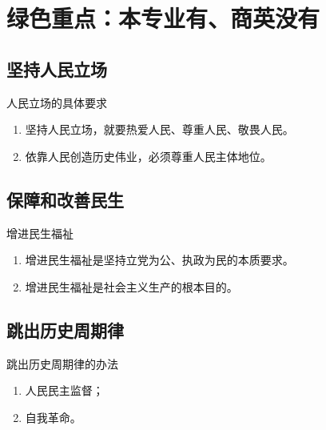 \documentclass[12pt,a4paper]{ctexart}
\begin{document}
\section{绿色重点：本专业有、商英没有}

\subsection{坚持人民立场}

\begin{greenbox}{人民立场的具体要求}
\begin{enumerate}
  \item 坚持人民立场，就要热爱人民、尊重人民、敬畏人民。
  \item 依靠人民创造历史伟业，必须尊重人民主体地位。
\end{enumerate}
\end{greenbox}

\subsection{保障和改善民生}

\begin{greenbox}{增进民生福祉}
\begin{enumerate}
  \item 增进民生福祉是坚持立党为公、执政为民的本质要求。
  \item 增进民生福祉是社会主义生产的根本目的。
\end{enumerate}
\end{greenbox}

\subsection{跳出历史周期律}

\begin{greenbox}{跳出历史周期律的办法}
\begin{enumerate}
  \item 人民民主监督；
  \item 自我革命。
\end{enumerate}
\end{greenbox}
\end{document}

